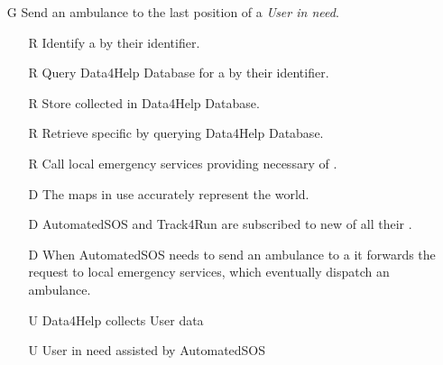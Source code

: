 \documentclass[../../../rasd.tex]{subfiles}
\begin{document}
\begin{itemize}
	\item[G\subs{7}]Send an ambulance to the last position of a \textit{User in need}.
	\begin{itemize}
		\item[R\subs{6}]Identify a  by their identifier.
		\item[R\subs{7}]Query Data4Help Database for a  by their identifier.
		\item[R\subs{11}]Store collected  in Data4Help Database.
		\item[R\subs{12}]Retrieve specific  by querying Data4Help Database.
		\item[R\subs{38}]Call local emergency services providing necessary  of .
		\\
		\item[D\subs{3}]The maps in use accurately represent the world.
		\item[D\subs{6}]AutomatedSOS and Track4Run are subscribed to new  of all their .
		\item[D\subs{7}]When AutomatedSOS needs to send an ambulance to a  it forwards the request to local emergency services, which eventually dispatch an ambulance.
		\\
		\item[U\subs{5}]Data4Help collects User data
		\item[U\subs{12}]User in need assisted by AutomatedSOS
	\end{itemize}
\end{itemize}
\end{document}
